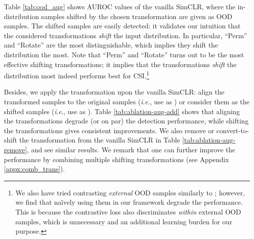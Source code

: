 \documentclass{article}
\newcommand{\ie}{\textit{i}.\textit{e}.}
\begin{document}
Table \ref{tab:ood_aug} shows AUROC values of the vanilla SimCLR, where the in-distribution samples shifted by the chosen transformation are given as OOD samples. The shifted samples are easily detected: it validates our intuition that the considered transformations \textit{shift} the input distribution. In particular, ``Perm'' and ``Rotate'' are the most distinguishable, which implies they shift the distribution the most. Note that ``Perm'' and ``Rotate'' turns out to be the most effective shifting transformations; it implies that the transformations \textit{shift} the distribution most indeed performs best for CSI.\footnote{We also have tried contrasting \textit{external} OOD samples similarly to \citep{hendrycks2019deep}; however, we find that na\"ively using them in our framework degrade the performance. This is because the contrastive loss also discriminates \textit{within} external OOD samples, which is unnecessary and an additional learning burden for our purpose.}


Besides, we apply the transformation upon the vanilla SimCLR: align the transformed samples to the original samples (\ie, use as ) or consider them as the shifted samples (\ie, use as ). Table \ref{tab:ablation-aug-add} shows that aligning the transformations degrade (or on par) the detection performance, while shifting the transformations gives consistent improvements. We also remove or convert-to-shift the transformation from the vanilla SimCLR in Table \ref{tab:ablation-aug-remove}, and see similar results. We remark that one can further improve the performance by combining multiple shifting transformations (see Appendix \ref{appx:comb_trans}).
\end{document}
